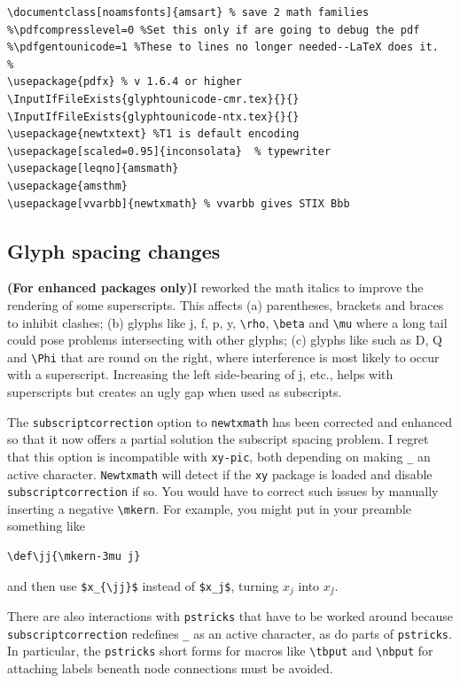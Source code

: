 \documentclass[\fsc]{article}
\theoremstyle{oldplain}
\theoremstyle{plain}
\begin{document}
\begin{verbatim}
\documentclass[noamsfonts]{amsart} % save 2 math families 
%\pdfcompresslevel=0 %Set this only if are going to debug the pdf
%\pdfgentounicode=1 %These to lines no longer needed--LaTeX does it.
% 
\usepackage{pdfx} % v 1.6.4 or higher
\InputIfFileExists{glyphtounicode-cmr.tex}{}{} 
\InputIfFileExists{glyphtounicode-ntx.tex}{}{}
\usepackage{newtxtext} %T1 is default encoding
\usepackage[scaled=0.95]{inconsolata}  % typewriter
\usepackage[leqno]{amsmath} 
\usepackage{amsthm}
\usepackage[vvarbb]{newtxmath} % vvarbb gives STIX Bbb
\end{verbatim} 


\subsection{Glyph spacing changes} \textbf{(For enhanced packages only)}I reworked the math italics to improve the rendering of some  superscripts. This affects (a)  parentheses, brackets and braces to inhibit clashes; (b) glyphs like j, f, p, y, \verb|\rho|,  \verb|\beta| and  \verb|\mu| where a long tail could pose problems intersecting with other glyphs; (c) glyphs like such as D, Q and \verb|\Phi| that are round on the right, where interference is most likely to occur with a superscript. Increasing the left side-bearing of j, etc., helps with superscripts but creates an ugly gap when used as subscripts.  


 The {\tt subscriptcorrection} option to {\tt newtxmath} has been corrected and enhanced  so that it now offers a partial solution the subscript spacing problem. I regret that this option is incompatible with {\tt xy-pic}, both depending on making \verb|_| an active character. {\tt Newtxmath}  will detect if the {\tt xy} package is loaded and disable {\tt subscriptcorrection} if so. You would have to correct such issues by manually inserting a negative \verb|\mkern|. For example, you might put in your preamble something like
 \begin{verbatim}
\def\jj{\mkern-3mu j}
\end{verbatim}
and then use \verb|$x_{\jj}$| instead of \verb|$x_j$|, turning $x_j$ into $x_{\jj}$.

There are also interactions with {\tt pstricks} that have to be worked around because {\tt subscriptcorrection} redefines \verb|_| as an active character, as do parts of {\tt pstricks}. In particular, the {\tt pstricks} short forms for macros like \verb|\tbput| and \verb|\nbput| for attaching labels beneath node connections must be avoided.
\end{document}
